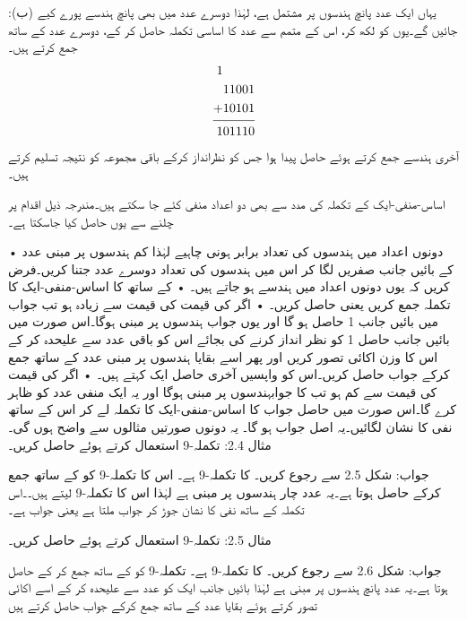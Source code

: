 :\quad  (ب) یہاں ایک عدد پانچ ہندسوں پر مشتمل  ہے،  لہٰذا دوسرے عدد  میں بھی  پانچ ہندسے پورے  کیے  جائیں گے۔یوں    کو  لکھ کر،  اس  کے   متمم 
  سے  عدد کا اساسی تکملہ  حاصل کر  کے،  دوسرے عدد کے ساتھ جمع کرتے ہیں۔
\begin{align*}
\begin{split}
1\phantom{11001}&\\
11001&\\
+10101&\\
\noalign{\smallskip}\hline\noalign{\smallskip}
101110&
\end{split}
\end{align*}
آخری ہندسے جمع کرتے ہوئے حاصل  پیدا ہوا جس کو نظرانداز کرکے  باقی مجموعہ  کو نتیجہ  تسلیم کرتے  ہیں۔

	اساس-منفی-ایک کے تکملہ کی مدد سے بھی دو اعداد منفی کئے جا سکتے ہیں۔مندرجہ ذیل اقدام پر چلنے سے یوں  حاصل کیا جاسکتا ہے۔

    • دونوں اعداد میں ہندسوں کی تعداد برابر ہونی چاہیے لہٰذا کم ہندسوں پر مبنی عدد کے بائیں جانب صفریں لگا کر اس میں ہندسوں کی تعداد دوسرے عدد جتنا کریں۔فرض کریں کہ یوں دونوں اعداد میں  ہندسے ہو جاتے ہیں۔
    •  کے ساتھ  کا اساس-منفی-ایک کا تکملہ جمع کریں 
      یعنی حاصل کریں۔
    • اگر  کی قیمت  کی قیمت سے زیادہ ہو تب جواب میں بائیں جانب 1 حاصل ہو گا اور یوں جواب  ہندسوں پر مبنی ہوگا۔اس صورت میں بائیں جانب حاصل 1 کو نظر انداز کرنے کی بجائے اس کو باقی عدد سے علیحدہ کر کے اس کا وزن اکائی تصور کریں اور پھر  اسے بقایا ہندسوں پر مبنی عدد کے ساتھ جمع کرکے جواب حاصل کریں۔اس کو واپسیں آخری حاصل ایک کہتے ہیں۔
    • اگر کی قیمت کی قیمت سے کم ہو تب کا جوابہندسوں پر مبنی ہوگا اور یہ ایک منفی عدد کو ظاہر کرے گا۔اس صورت میں حاصل جواب کا اساس-منفی-ایک کا تکملہ لے کر اس کے ساتھ نفی کا نشان لگائیں۔یہ اصل جواب ہو گا۔
یہ دونوں صورتیں مثالوں سے واضح ہوں گی۔
مثال 2.4: تکملہ-9 استعمال کرتے ہوئے   حاصل کریں۔ 

جواب: شکل 2.5 سے رجوع کریں۔
  کا تکملہ-9  ہے۔
اس  کا تکملہ-9  کو  کے ساتھ جمع کرکے حاصل ہوتا ہے۔یہ عدد چار ہندسوں پر مبنی ہے لہٰذا اس کا  تکملہ-9 لیتے ہیں۔۔اس تکملہ کے ساتھ نفی کا نشان جوڑ کر جواب ملتا ہے یعنی جواب ہے۔

مثال 2.5: تکملہ-9 استعمال کرتے ہوئے   حاصل کریں۔ 

جواب: شکل 2.6 سے رجوع کریں۔
  کا تکملہ-9  ہے۔
تکملہ-9  کو  کے ساتھ جمع کر کے حاصل ہوتا ہے۔یہ عدد پانچ ہندسوں پر مبنی ہے لہٰذا بائیں جانب ایک کو عدد سے علیحدہ کر کے اسے اکائی تصور کرتے ہوئے بقایا عدد کے ساتھ جمع کرکے جواب حاصل کرتے ہیں


